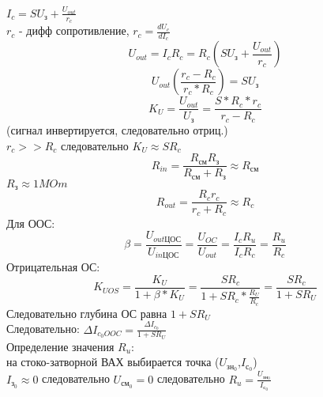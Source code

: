 $I_{c}=SU_{\text{з}}+\frac{U_{out}}{r_{c}}$\\
$r_{c}$ - дифф сопротивление, $r_{c}=\frac{dU_{c}}{dI_{c}}$\\
$$
U_{out}=I_{c}R_{c}=R_{c}(SU_{\text{з}}+\frac{U_{out}}{r_{c}})
$$
$$
U_{out}(\frac{r_{c}-R_{c}}{r_{c}*R_{c}})=SU_{\text{з}}
$$
$$
K_{U}=\frac{U_{out}}{U_{\text{з}}}=\frac{S*R_{c}*r_{c}}{r_{c}-R_{c}}
$$
(сигнал инвертируется, следовательно отриц.)\\
$r_{c}>>R_{c}$ следовательно $K_{U}\approx SR_{c}$
$$
R_{in}=\frac{R_{\text{см}}R_{\text{з}}}{R_{\text{см}}+R_{\text{з}}}\approx R_{\text{см}}
$$
$R_{\text{з}}\approx 1MOm$
$$
R_{out}=\frac{R_{c}r_{c}}{r_{c}+R_{c}}\approx R_{c}
$$
Для ООС:
$$
\beta=\frac{U_{out\text{ЦОС}}}{U_{in\text{ЦОС}}}=\frac{U_{OC}}{U_{out}}=\frac{I_{c}R_{u}}{I_{c}R_{c}}=\frac{R_{u}}{R_{c}}
$$
Отрицательная ОС:
$$
K_{UOS}=\frac{K_{U}}{1+\beta*K_{U}}=\frac{SR_{c}}{1+SR_{c}*\frac{R_{U}}{R_{c}}}=\frac{SR_{c}}{1+SR_{U}}
$$
Следовательно глубина ОС равна $1+SR_{U}$\\
Следовательно: $\Delta I_{c_{0}OOC}=\frac{\Delta I_{c_{0}}}{1+SR_{U}}$\\
Определение значения $R_{u}$:\\
на стоко-затворной ВАХ выбирается точка ($U_{\text{зн}_{0}}$,$I_{\text{с}_{0}}$)\\
$I_{\text{з}_{0}}\approx 0$ следовательно $U_{\text{см}_{0}}= 0$ следовательно $R_{u}=\frac{U_{\text{зн}_{0}}}{I_{\text{с}_{0}}}$
\begin{center}
\begin{figure}[h!]
\end{figure}
\end{center}
